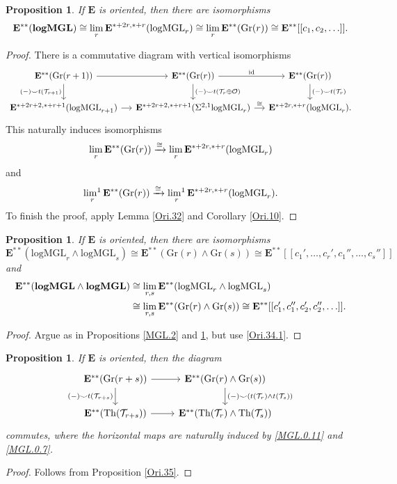 \documentclass[11pt, a4paper]{amsart}
\newtheorem{prop}[thm]{Proposition}
\theoremstyle{definition}
\numberwithin{equation}{subsection}
\newcommand{\id}{\operatorname{id}}   			%
\newcommand{\limit}{\mathop{\rm lim}}
\newcommand{\limitone}{\mathop{\rm lim^1}}
\newcommand{\Gr}{{\mathrm{Gr}}}
\newcommand{\Thom}{\mathrm{Th}}
\newcommand{\logMGL}{{\mathrm{logMGL}}}
\newcommand{\spectlogMGL}{{\mathbf{logMGL}}}
\newcommand{\cO}{\mathcal{O}}
\newcommand{\cT}{\mathcal{T}}
\newcommand{\ringE}{\mathbf{E}}
\begin{document}
\begin{prop}
\label{MGL.3}
If $\ringE$ is oriented, 
then there are isomorphisms
\[
\ringE^{**}(\spectlogMGL)
\cong
\limit_r \ringE^{*+2r,*+r}(\logMGL_r)
\cong
\limit_r \ringE^{**}(\Gr(r))
\cong
\ringE^{**}[[c_1,c_2,\ldots]].
\]
\end{prop}
\begin{proof}
There is a commutative diagram with vertical isomorphisms
\begin{equation}
\label{MGL.3.1}
\begin{tikzcd}[column sep=small]
\ringE^{**}(\Gr(r+1))\ar[r]\ar[d,"(-)\smile t(\cT_{r+1})"']&
\ringE^{**}(\Gr(r))\ar[d,"(-)\smile t(\cT_r\oplus \cO)"]\ar[r,"\id"]&
\ringE^{**}(\Gr(r))\ar[d,"(-)\smile t(\cT_r)"]
\\
\ringE^{*+2r+2,*+r+1}(\logMGL_{r+1})\ar[r]&
\ringE^{*+2r+2,*+r+1}(\Sigma^{2,1}\logMGL_r)\ar[r,"\cong"]&
\ringE^{*+2r,*+r}(\logMGL_r).
\end{tikzcd}
\end{equation}
This naturally induces isomorphisms
\[
\limit_r \ringE^{**}(\Gr(r))
\xrightarrow{\cong}
\limit_r \ringE^{*+2r,*+r}(\logMGL_r)
\]
and
\[
\limitone_r \ringE^{**}(\Gr(r))
\xrightarrow{\cong}
\limitone_r \ringE^{*+2r,*+r}(\logMGL_r).
\]
To finish the proof, apply Lemma \ref{Ori.32} and Corollary \ref{Ori.10}.
\end{proof}

\begin{prop}
\label{MGL.4}
If $\ringE$ is oriented, 
then there are isomorphisms
\[
\ringE^{**}(\logMGL_r\wedge \logMGL_s)
\cong
\ringE^{**}(\Gr(r)\wedge \Gr(s))
\cong
\ringE^{**}[[c_1',\ldots,c_r',c_1'',\ldots,c_s'']]
\]
and
\begin{align*}
\ringE^{**}(\spectlogMGL\wedge \spectlogMGL)
&\cong
\limit_{r,s}\ringE^{**}(\logMGL_r\wedge \logMGL_s)
\\
&\cong
\limit_{r,s}\ringE^{**}(\Gr(r)\wedge \Gr(s))
\cong
\ringE^{**}[[c_1',c_1'',c_2',c_2'',\ldots]].
\end{align*}
\end{prop}
\begin{proof}
Argue as in Propositions \ref{MGL.2} and \ref{MGL.3}, but use \eqref{Ori.34.1}.
\end{proof}

\begin{prop}
\label{MGL.8}
If $\ringE$ is oriented, 
then the diagram
\[
\begin{tikzcd}
\ringE^{**}(\Gr(r+s))\ar[r]\ar[d,"(-)\smile t(\cT_{r+s})"']&
\ringE^{**}(\Gr(r)\wedge \Gr(s))\ar[d,"(-)\smile (t(\cT_r)\wedge t(\cT_s))"]
\\
\ringE^{**}(\Thom(\cT_{r+s}))\ar[r]&
\ringE^{**}(\Thom(\cT_r)\wedge \Thom(\cT_s))
\end{tikzcd}
\]
commutes, where the horizontal maps are naturally induced by \eqref{MGL.0.11} and \eqref{MGL.0.7}.
\end{prop}
\begin{proof}
Follows from Proposition \ref{Ori.35}.
\end{proof}
\end{document}

